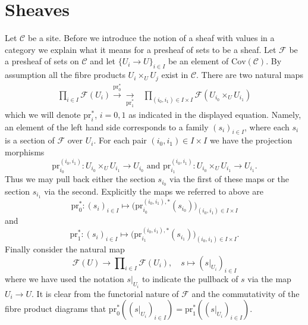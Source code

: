 \section{Sheaves}
\label{sites-section-sheaves}
Let $\mathcal{C}$ be a site. Before we introduce the notion of
a sheaf with values in a category we explain what it means
for a presheaf of sets to be a sheaf. Let $\mathcal{F}$ be
a presheaf of sets on $\mathcal{C}$ and let
$\{U_i \to U\}_{i\in I}$ be an element of $\text{Cov}(\mathcal{C})$.
By assumption all the fibre products $U_i \times_U U_j$ exist
in $\mathcal{C}$. There are two natural maps
$$
\begin{array}{cc}\prod\nolimits_{i\in I}
\mathcal{F}(U_i)
\overset{\text{pr}_0^*}{\longrightarrow}\underset{\text{pr}_1^*}{\longrightarrow} & \prod\nolimits_{(i_0, i_1) \in I \times I}
\mathcal{F}(U_{i_0} \times_U U_{i_1})\end{array}
$$
which we will denote $\text{pr}^*_i$, $i = 0, 1$ as indicated
in the displayed equation.
Namely, an element of the left hand side corresponds to a
family $(s_i)_{i\in I}$, where each $s_i$ is a section of
$\mathcal{F}$ over $U_i$. For each pair $(i_0, i_1) \in I \times I$
we have the projection morphisms
$$
\text{pr}^{(i_0, i_1)}_{i_0} :
U_{i_0} \times_U U_{i_1}
\longrightarrow
U_{i_0}
\text{ and }
\text{pr}^{(i_0, i_1)}_{i_1} :
U_{i_0} \times_U U_{i_1}
\longrightarrow
U_{i_1}.
$$
Thus we may pull back either the section $s_{i_0}$ via
the first of these maps or the section $s_{i_1}$ via the
second. Explicitly the maps we referred to above are
$$
\text{pr}_0^* :
(s_i)_{i\in I}
\longmapsto
\Big(
\text{pr}^{(i_0, i_1), *}_{i_0}(s_{i_0})
\Big)_{(i_0, i_1) \in I \times I}
$$
and
$$
\text{pr}_1^* :
(s_i)_{i\in I}
\longmapsto
\Big(
\text{pr}^{(i_0, i_1), *}_{i_1}(s_{i_1})
\Big)_{(i_0, i_1) \in I \times I}.
$$
Finally consider the natural map
$$
\mathcal{F}(U)
\longrightarrow
\prod\nolimits_{i\in I}
\mathcal{F}(U_i), \quad
s
\longmapsto
(s|_{U_i})_{i \in I}
$$
where we have used the notation $s|_{U_i}$ to indicate the
pullback of $s$ via the map $U_i \to U$. It is clear from the
functorial nature of $\mathcal{F}$ and the commutativity
of the fibre product diagrams that
$\text{pr}_0^*( (s|_{U_i})_{i \in I} ) =
\text{pr}_1^*( (s|_{U_i})_{i \in I} )$.

